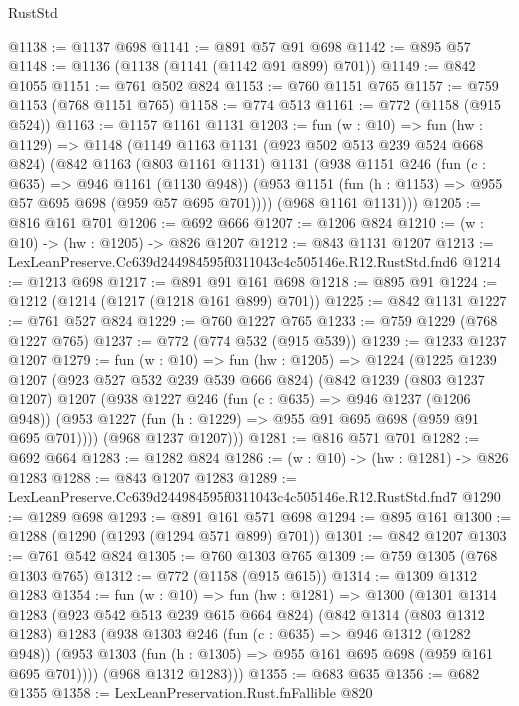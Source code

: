 \begin{lexlean}{RustStd}
\begin{coremodule}
@1138 := @1137 @698
@1141 := @891 @57 @91 @698
@1142 := @895 @57
@1148 := @1136 (@1138 (@1141 (@1142 @91 @899) @701))
@1149 := @842 @1055
@1151 := @761 @502 @824
@1153 := @760 @1151 @765
@1157 := @759 @1153 (@768 @1151 @765)
@1158 := @774 @513
@1161 := @772 (@1158 (@915 @524))
@1163 := @1157 @1161 @1131
@1203 := fun (w : @10) =>
  fun (hw : @1129) =>
  @1148
    (@1149
      @1163
      @1131
      (@923 @502 @513 @239 @524 @668 @824)
      (@842
        @1163
        (@803 @1161 @1131)
        @1131
        (@938
          @1151
          @246
          (fun (c : @635) => @946 @1161 (@1130 @948))
          (@953 @1151 (fun (h : @1153) => @955 @57 @695 @698 (@959 @57 @695 @701))))
        (@968 @1161 @1131)))
@1205 := @816 @161 @701
@1206 := @692 @666
@1207 := @1206 @824
@1210 := (w : @10) -> (hw : @1205) -> @826 @1207
@1212 := @843 @1131 @1207
@1213 := LexLeanPreserve.Cc639d244984595f0311043c4c505146e.R12.RustStd.fnd6
@1214 := @1213 @698
@1217 := @891 @91 @161 @698
@1218 := @895 @91
@1224 := @1212 (@1214 (@1217 (@1218 @161 @899) @701))
@1225 := @842 @1131
@1227 := @761 @527 @824
@1229 := @760 @1227 @765
@1233 := @759 @1229 (@768 @1227 @765)
@1237 := @772 (@774 @532 (@915 @539))
@1239 := @1233 @1237 @1207
@1279 := fun (w : @10) =>
  fun (hw : @1205) =>
  @1224
    (@1225
      @1239
      @1207
      (@923 @527 @532 @239 @539 @666 @824)
      (@842
        @1239
        (@803 @1237 @1207)
        @1207
        (@938
          @1227
          @246
          (fun (c : @635) => @946 @1237 (@1206 @948))
          (@953 @1227 (fun (h : @1229) => @955 @91 @695 @698 (@959 @91 @695 @701))))
        (@968 @1237 @1207)))
@1281 := @816 @571 @701
@1282 := @692 @664
@1283 := @1282 @824
@1286 := (w : @10) -> (hw : @1281) -> @826 @1283
@1288 := @843 @1207 @1283
@1289 := LexLeanPreserve.Cc639d244984595f0311043c4c505146e.R12.RustStd.fnd7
@1290 := @1289 @698
@1293 := @891 @161 @571 @698
@1294 := @895 @161
@1300 := @1288 (@1290 (@1293 (@1294 @571 @899) @701))
@1301 := @842 @1207
@1303 := @761 @542 @824
@1305 := @760 @1303 @765
@1309 := @759 @1305 (@768 @1303 @765)
@1312 := @772 (@1158 (@915 @615))
@1314 := @1309 @1312 @1283
@1354 := fun (w : @10) =>
  fun (hw : @1281) =>
  @1300
    (@1301
      @1314
      @1283
      (@923 @542 @513 @239 @615 @664 @824)
      (@842
        @1314
        (@803 @1312 @1283)
        @1283
        (@938
          @1303
          @246
          (fun (c : @635) => @946 @1312 (@1282 @948))
          (@953 @1303 (fun (h : @1305) => @955 @161 @695 @698 (@959 @161 @695 @701))))
        (@968 @1312 @1283)))
@1355 := @683 @635
@1356 := @682 @1355
@1358 := LexLeanPreservation.Rust.fnFallible @820

\end{coremodule}
\end{lexlean}
